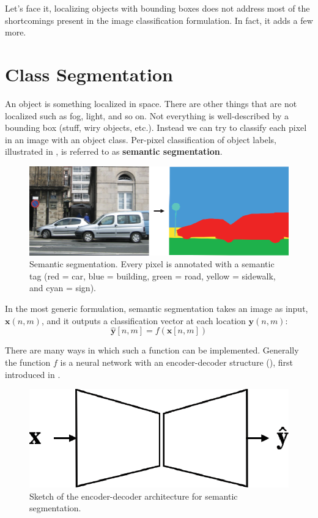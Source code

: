 Let's face it, localizing objects with bounding boxes does not address most of the shortcomings present in the image classification formulation. In fact, it adds a few more.
		

\section{Class Segmentation}

An object is something localized in space. There are other things that are not localized such as fog, light, and so on. Not everything is well-described by a bounding box (stuff, wiry objects, etc.). Instead we can try to classify each pixel in an image with an object class. Per-pixel classification of object labels, illustrated in \fig{\ref{fig:semantic_class_segmentation}}, is referred to as {\bf semantic segmentation}. 


\begin{figure}
\centerline{
\includegraphics[width=0.6\linewidth]{figures/object_recognition/semantic.eps}
}
\caption{Semantic segmentation. Every pixel is annotated with a semantic tag (red = car, blue = building, green = road, yellow = sidewalk, and cyan = sign).}
\label{fig:semantic_class_segmentation}
\end{figure}

In the most generic formulation, semantic segmentation takes an image as input, $\mathbf{x}(n,m)$, and it outputs a classification vector at each location $\mathbf{y}(n,m)$:
\begin{equation}
\hat{\mathbf{y}} \left[n,m \right] = f(\mathbf{x} \left[n,m \right])
\end{equation}

 
 
There are many ways in which such a function can be implemented. Generally the function $f$ is a neural network with an encoder-decoder structure (\fig{\ref{fig:segmentation_architecture}}), first introduced in \cite{Badrinarayanan2015}. 

\begin{figure}
\centerline{
\includegraphics[width=0.3\linewidth]{figures/object_recognition/segmentation_architecture.eps}
}
\caption{Sketch of the encoder-decoder architecture for semantic segmentation.}
\label{fig:segmentation_architecture}
\end{figure}

